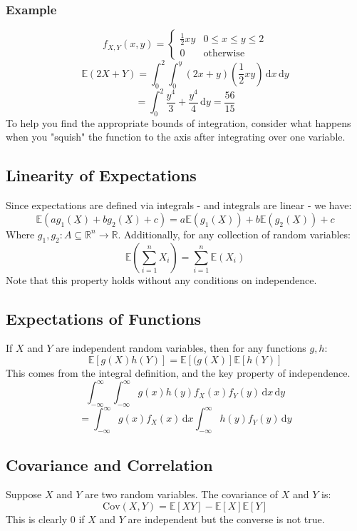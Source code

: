 \documentclass[12pt]{article}
\begin{document}
\subsubsection*{Example}
\[f_{X,Y}(x,y)=\begin{cases}
    \frac{1}{2}xy & 0\leq x\leq y\leq 2 \\
    0&\text{otherwise}
\end{cases}\]
\[\mathbb{E}(2X+Y)=\int^2_0\int^y_0(2x+y)(\frac{1}{2}xy)\,\text{d}x\,\text{d}y\]
\[=\int^2_0\frac{y^4}{3}+\frac{y^4}{4}\,\text{d}y=\frac{56}{15}\]
To help you find the appropriate bounds of integration, consider what happens when you "squish" the function to the axis after integrating over one variable.
\subsection{Linearity of Expectations}
Since expectations are defined via integrals - and integrals are linear - we have:
\[\mathbb{E}(ag_1(\underline{X})+bg_2(\underline{X})+c)=a\mathbb{E}(g_1(\underline{X}))+b\mathbb{E}(g_2(\underline{X}))+c\]
Where \(g_1,g_2:A\subseteq \mathbb{R}^n\to \mathbb{R}\). Additionally, for any collection of random variables:
\[\mathbb{E}\left(\sum^n_{i=1}X_i\right)=\sum^n_{i=1}\mathbb{E}(X_i)\]
Note that this property holds without any conditions on independence.
\subsection{Expectations of Functions}
If \(X\) and \(Y\) are independent random variables, then for any functions \(g,h\):
\[\mathbb{E}[g(X)h(Y)]=\mathbb{E}[(g(X)]\mathbb{E}[h(Y)]\]
This comes from the integral definition, and the key property of independence.
\[\int^\infty_{-\infty}\int^\infty_{-\infty}g(x)h(y)f_X(x)f_Y(y)\,\text{d}x\,\text{d}y\]
\[=\int^\infty_{-\infty}g(x)f_X(x)\,\text{d}x\int^\infty_{-\infty}h(y)f_Y(y)\,\text{d}y\]
\subsection{Covariance and Correlation}
Suppose \(X\) and \(Y\) are two random variables. The covariance of \(X\) and \(Y\) is:
\[\text{Cov}(X,Y)=\mathbb{E}[XY]-\mathbb{E}[X]\mathbb{E}[Y]\]
This is clearly \(0\) if \(X\) and \(Y\) are independent but the converse is not true.
\end{document}
